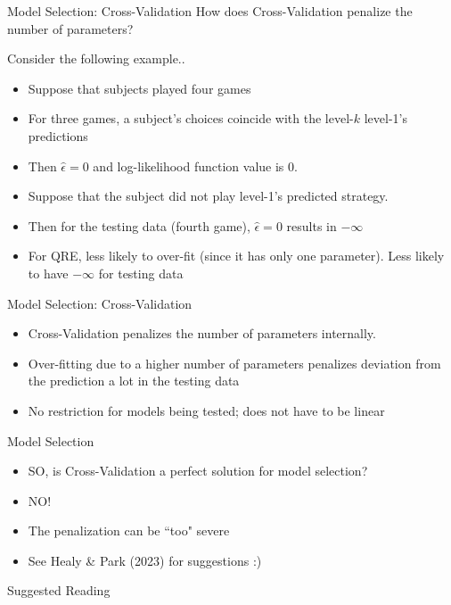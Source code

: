 \begin{frame}{Model Selection: Cross-Validation}
    How does Cross-Validation penalize the number of parameters?

    \bigskip
    Consider the following example..
    \begin{itemize}
        \item Suppose that subjects played four games
        \item For three games, a subject's choices coincide with the level-$k$ level-1's predictions
        \item Then $\hat \epsilon = 0$ and log-likelihood function value is 0.
        \item Suppose that the subject did not play level-1's predicted strategy.
        \item Then for the testing data (fourth game), $\hat \epsilon=0$ results in $-\infty$
        \item For QRE, less likely to over-fit (since it has only one parameter). Less likely to have $-\infty$ for testing data
    \end{itemize}
\end{frame}
\begin{frame}{Model Selection: Cross-Validation}
    \begin{itemize}
        \item Cross-Validation penalizes the number of parameters internally.
        \item Over-fitting due to a higher number of parameters penalizes deviation from the prediction a lot in the testing data
        \item No restriction for models being tested; does not have to be linear
    \end{itemize}
\end{frame}

\begin{frame}{Model Selection}
    \begin{itemize}
        \item SO, is Cross-Validation a perfect solution for model selection?
        \pause
        \item NO! \pause
        \item The penalization can be ``too" severe \pause
        \item See Healy \& Park (2023) for suggestions :)
    \end{itemize}
\end{frame}


\nocite{}

\begin{frame}[allowframebreaks]{Suggested Reading}
    
\end{frame}



